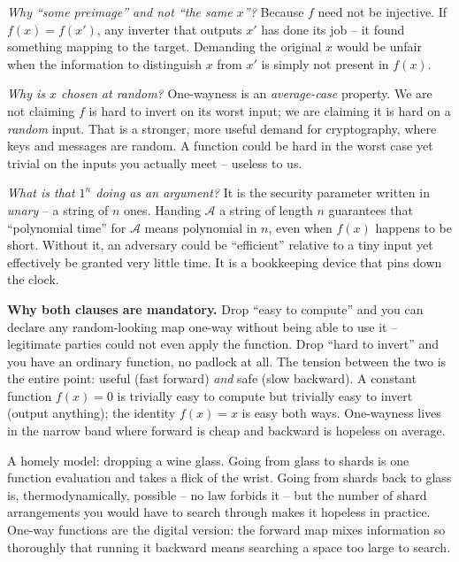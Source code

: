 \begin{walkbox}
\emph{Why ``some preimage'' and not ``the same $x$''?} Because $f$ need not be injective. If $f(x)=f(x')$, any inverter that outputs $x'$ has done its job -- it found something mapping to the target. Demanding the original $x$ would be unfair when the information to distinguish $x$ from $x'$ is simply not present in $f(x)$.

\emph{Why is $x$ chosen at random?} One-wayness is an \emph{average-case} property. We are not claiming $f$ is hard to invert on its worst input; we are claiming it is hard on a \emph{random} input. That is a stronger, more useful demand for cryptography, where keys and messages are random. A function could be hard in the worst case yet trivial on the inputs you actually meet -- useless to us.

\emph{What is that $1^{n}$ doing as an argument?} It is the security parameter written in \emph{unary} -- a string of $n$ ones. Handing $\mathcal A$ a string of length $n$ guarantees that ``polynomial time'' for $\mathcal A$ means polynomial in $n$, even when $f(x)$ happens to be short. Without it, an adversary could be ``efficient'' relative to a tiny input yet effectively be granted very little time. It is a bookkeeping device that pins down the clock.
\end{walkbox}

\begin{whybox}
\textbf{Why both clauses are mandatory.} Drop ``easy to compute'' and you can declare any random-looking map one-way without being able to use it -- legitimate parties could not even apply the function. Drop ``hard to invert'' and you have an ordinary function, no padlock at all. The tension between the two is the entire point: useful (fast forward) \emph{and} safe (slow backward). A constant function $f(x)=0$ is trivially easy to compute but trivially easy to invert (output anything); the identity $f(x)=x$ is easy both ways. One-wayness lives in the narrow band where forward is cheap and backward is hopeless on average.
\end{whybox}

\begin{intuitionbox}
A homely model: dropping a wine glass. Going from glass to shards is one function evaluation and takes a flick of the wrist. Going from shards back to glass is, thermodynamically, possible -- no law forbids it -- but the number of shard arrangements you would have to search through makes it hopeless in practice. One-way functions are the digital version: the forward map mixes information so thoroughly that running it backward means searching a space too large to search.
\end{intuitionbox}


